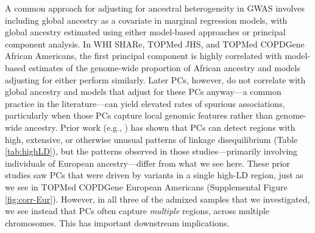 \documentclass[12pt]{article}
\begin{document}
A common approach for adjusting for ancestral heterogeneity in GWAS involves including global ancestry as a covariate in marginal regression models, with global ancestry estimated using either model-based approaches or principal component analysis.
In WHI SHARe, TOPMed JHS, and TOPMed COPDGene African Americans, the first principal component is highly correlated with model-based estimates of the genome-wide proportion of African ancestry %
and models adjusting for either perform similarly.
Later PCs, however, do not correlate with global ancestry and models that adjust for these PCs anyway---a common practice in the literature---can yield elevated rates of spurious associations, particularly when those PCs capture local genomic features rather than genome-wide ancestry.  %
Prior work (e.g., \citep{zou2010, prive2020}) has shown that PCs can detect regions with high, extensive, or otherwise unusual patterns of linkage disequilibrium (Table \ref{tab:highLD}), but the patterns observed in those studies---primarily involving individuals of European ancestry---differ from what we see here.
These prior studies saw PCs that were driven by variants in a single high-LD region, just as we see in TOPMed COPDGene European Americans (Supplemental Figure \ref{fig:corr-Eur}).
However, in all three of the admixed samples that we investigated, we see instead that PCs often capture \textit{multiple} regions, across multiple chromosomes. 
This has important downstream implications.
\end{document}
